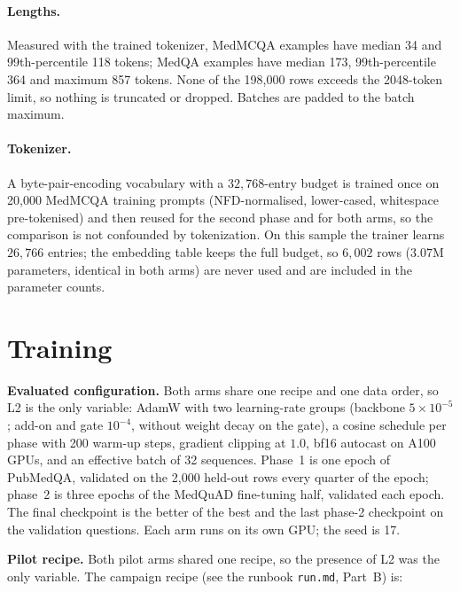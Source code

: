 \documentclass[11pt,a4paper]{article}
\theoremstyle{plain}
\theoremstyle{definition}
\theoremstyle{remark}
\begin{document}
\paragraph{Lengths.}
Measured with the trained tokenizer, MedMCQA examples have median 34 and
99th-percentile 118 tokens; MedQA examples have median 173, 99th-percentile 364
and maximum 857 tokens. None of the 198{,}000 rows exceeds the 2048-token
limit, so nothing is truncated or dropped. Batches are padded to the batch
maximum.

\paragraph{Tokenizer.}
A byte-pair-encoding vocabulary \cite{sennrich2015bpe} with a $32{,}768$-entry
budget is
trained once on 20{,}000 MedMCQA training prompts (NFD-normalised, lower-cased,
whitespace pre-tokenised) and then reused for the second phase and for both
arms, so the comparison is not confounded by tokenization. On this sample the
trainer learns $26{,}766$ entries; the embedding table keeps the full budget, so
$6{,}002$ rows ($3.07$M parameters, identical in both arms) are never used and
are included in the parameter counts.

\section{Training}
\label{sec:training}

\noindent
\textbf{Evaluated configuration.} Both arms share one recipe and one
data order, so L2 is the only variable: AdamW with two learning-rate
groups (backbone $5\times10^{-5}$; add-on and gate $10^{-4}$, without weight
decay on the gate), a cosine schedule per phase with 200 warm-up steps,
gradient clipping at $1.0$, bf16 autocast on A100 GPUs, and an effective batch
of 32 sequences. Phase~1 is one epoch of PubMedQA, validated on the 2{,}000
held-out rows every quarter of the epoch; phase~2 is three epochs of the
MedQuAD fine-tuning half, validated each epoch. The final checkpoint is the
better of the best and the last phase-2 checkpoint on the validation
questions. Each arm runs on its own GPU; the seed is 17.

\noindent
\textbf{Pilot recipe.} Both pilot arms shared one recipe, so the presence of
L2 was the only variable. The campaign recipe (see the runbook
\texttt{run.md}, Part~B) is:
\end{document}
